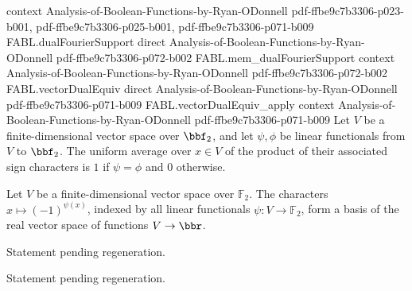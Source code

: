 \begin{theorem}
  {context}
  {Analysis-of-Boolean-Functions-by-Ryan-ODonnell}
  {pdf-ffbe9c7b3306-p023-b001,
    pdf-ffbe9c7b3306-p025-b001,
    pdf-ffbe9c7b3306-p071-b009}
\proofstep
  {FABL.dualFourierSupport}
  {direct}
  {Analysis-of-Boolean-Functions-by-Ryan-ODonnell}
  {pdf-ffbe9c7b3306-p072-b002}
\proofstep
  {FABL.mem_dualFourierSupport}
  {context}
  {Analysis-of-Boolean-Functions-by-Ryan-ODonnell}
  {pdf-ffbe9c7b3306-p072-b002}
\proofstep
  {FABL.vectorDualEquiv}
  {direct}
  {Analysis-of-Boolean-Functions-by-Ryan-ODonnell}
  {pdf-ffbe9c7b3306-p071-b009}
\proofstep
  {FABL.vectorDualEquiv_apply}
  {context}
  {Analysis-of-Boolean-Functions-by-Ryan-ODonnell}
  {pdf-ffbe9c7b3306-p071-b009}
Let $V$ be a finite-dimensional vector space over $\bbf_2$, and let $\psi,\phi$ be
linear functionals from $V$ to $\bbf_2$. The uniform average over $x\in V$ of the
product of their associated sign characters is $1$ if $\psi=\phi$ and $0$ otherwise.
\end{theorem}

\begin{definition}
\label{FABL.dualWalshBasis}
\leanok
{}
Let $V$ be a finite-dimensional vector space over $\mathbb{F}_2$. The characters
$x\mapsto(-1)^{\psi(x)}$, indexed by all linear functionals $\psi:V\to\mathbb{F}_2$,
form a basis of the real vector space of functions $V\to\bbr$.
\end{definition}

\begin{theorem}
\label{FABL.dualWalshBasis_repr}
\leanok
{}
Statement pending regeneration.
\end{theorem}

\begin{theorem}
\label{FABL.dual_fourier_expansion}
\leanok
{}
Statement pending regeneration.
\end{theorem}


